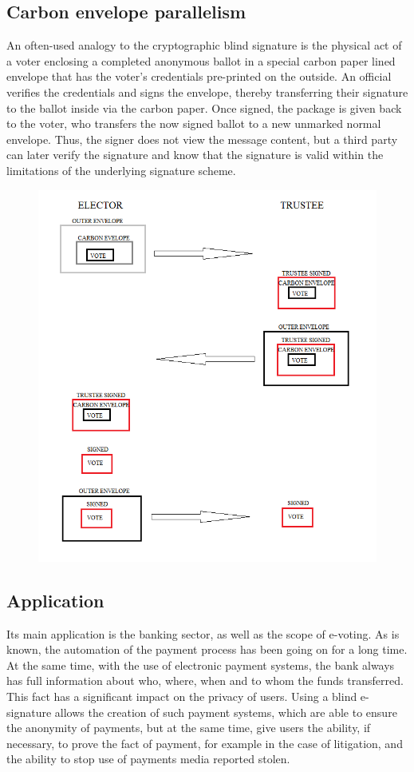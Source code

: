 \documentclass{article}
\begin{document}
\subsection{Carbon envelope parallelism}
An often-used analogy to the cryptographic blind signature is the physical act of a voter enclosing a completed anonymous ballot in a special carbon paper lined envelope that has the voter's credentials pre-printed on the outside. An official verifies the credentials and signs the envelope, thereby transferring their signature to the ballot inside via the carbon paper. Once signed, the package is given back to the voter, who transfers the now signed ballot to a new unmarked normal envelope. Thus, the signer does not view the message content, but a third party can later verify the signature and know that the signature is valid within the limitations of the underlying signature scheme.
\begin{figure}[h!]
\centering
\includegraphics[scale=0.7]{BlindedSignature.png}
\end{figure}
\subsection{Application}
Its main application is the banking sector, as well as the scope of e-voting. As is known, the automation of the payment process has been going on for a long time. At the same time, with the use of electronic payment systems, the bank always has full information about who, where, when and to whom the funds transferred. This fact has a significant impact on the privacy of users. Using a blind e-signature allows the creation of such payment systems, which are able to ensure the anonymity of payments, but at the same time, give users the ability, if necessary, to prove the fact of payment, for example in the case of litigation, and the ability to stop use of payments media reported  stolen.
\end{document}

